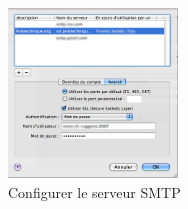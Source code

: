 \begin{figure}[!hl]
    \begin{center}
            \includegraphics[width=0.4\textwidth]{images/mac_config_smtp_poltechnique.png} 
      \caption{Configurer le serveur SMTP }
    \end{center}
  \end{figure}








